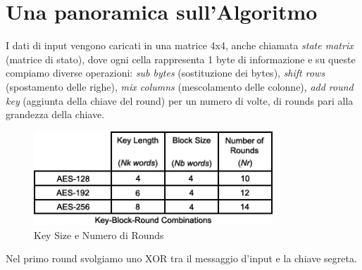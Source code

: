 


\section{Una panoramica sull'Algoritmo} %


     

\textsf{\small I dati di input vengono caricati in una matrice 4x4, anche chiamata \emph{state matrix} (matrice di stato), dove ogni cella rappresenta 1 byte di informazione e su queste compiamo diverse operazioni: \emph{sub bytes} (sostituzione dei bytes), \emph{shift rows} (spostamento delle righe), \emph{mix columns} (mescolamento delle colonne), \emph{add round key} (aggiunta della chiave del round) per un numero di volte, di rounds pari alla grandezza della chiave.} %

\begin{figure}[H]
	\centering
	\includegraphics[width=0.8\textwidth, height=0.8\textheight, keepaspectratio]{./images/aes/key_size_and_number_of_rounds.png}
	\caption{Key Size e Numero di Rounds}
	\label{fig:aes_key_size_number_of_rounds}
\end{figure}


\textsf{\small Nel primo round svolgiamo uno XOR tra il messaggio d'input e la chiave segreta.}


